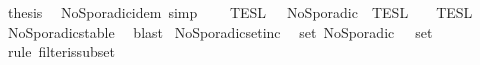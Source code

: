 \begin{isabellebody}
\ {\isacharquery}thesis\ \isacommand{{\isachardot}}\isamarkupfalse%
\isanewline
{}\isamarkupfalse%
%
\endisatagproof
{\isafoldproof}%
%
\isadelimproof
\isanewline
%
\endisadelimproof
\isanewline
{}\isamarkupfalse%
\ NoSporadic{\isacharunderscore}idem\ {\isacharbrackleft}simp{\isacharbrackright}{\isacharcolon}\isanewline
\ \ {\isacartoucheopen}{\isasymlbrakk}{\isasymlbrakk}\ {\isasymPhi}\ {\isasymrbrakk}{\isasymrbrakk}\isactrlsub T\isactrlsub E\isactrlsub S\isactrlsub L\ {\isasyminter}\ {\isasymlbrakk}{\isasymlbrakk}\ NoSporadic\ {\isasymPhi}\ {\isasymrbrakk}{\isasymrbrakk}\isactrlsub T\isactrlsub E\isactrlsub S\isactrlsub L\ {\isacharequal}\ {\isasymlbrakk}{\isasymlbrakk}\ {\isasymPhi}\ {\isasymrbrakk}{\isasymrbrakk}\isactrlsub T\isactrlsub E\isactrlsub S\isactrlsub L{\isacartoucheclose}\isanewline
%
\isadelimproof
%
\endisadelimproof
%
\isatagproof
{}\isamarkupfalse%
\ NoSporadic{\isacharunderscore}stable\ \isamarkupfalse%
\ blast%
\endisatagproof
{\isafoldproof}%
%
\isadelimproof
\isanewline
%
\endisadelimproof
\isanewline
{}\isamarkupfalse%
\ NoSporadic{\isacharunderscore}setinc{\isacharcolon}\isanewline
\ \ {\isacartoucheopen}set\ {\isacharparenleft}NoSporadic\ {\isasymPhi}{\isacharparenright}\ {\isasymsubseteq}\ set\ {\isasymPhi}{\isacartoucheclose}\isanewline
%
\isadelimproof
%
\endisadelimproof
%
\isatagproof
{}\isamarkupfalse%
\ {\isacharparenleft}rule\ filter{\isacharunderscore}is{\isacharunderscore}subset{\isacharparenright}\isanewline
%
\endisatagproof
{\isafoldproof}%
%
\isadelimproof
%
\endisadelimproof
\isanewline
%
\isadelimtheory
%
\endisadelimtheory
%
\isatagtheory
{}\isamarkupfalse%
%
\endisatagtheory
{\isafoldtheory}%
%
\isadelimtheory
%
\endisadelimtheory
%
\end{isabellebody}%
\endinput
